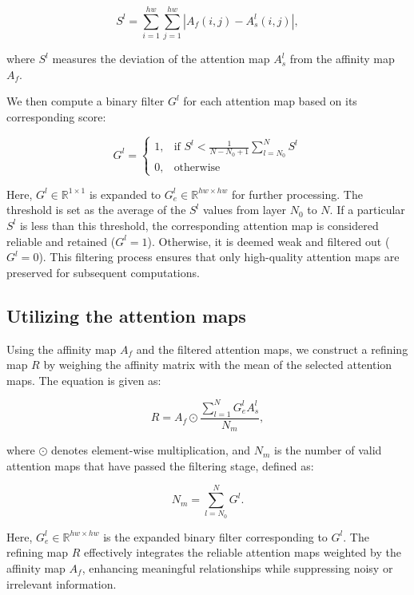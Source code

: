\begin{equation}
    S^l = \sum_{i=1}^{hw} \sum_{j=1}^{hw} \left| A_f(i, j) - A_s^l(i, j) \right|,
\end{equation}

where $S^l$ measures the deviation of the attention map $A_s^l$ from the affinity map $A_f$.

We then compute a binary filter $G^l$ for each attention map based on its corresponding score:

\begin{equation}
    G^l =
    \begin{cases}
        1, & \text{if } S^l < \frac{1}{N - N_0 + 1} \sum_{l=N_0}^N S^l \\
        0, & \text{otherwise}
    \end{cases}
\end{equation}

Here, $G^l \in \mathbb{R}^{1 \times 1}$ is expanded to $G^l_e \in \mathbb{R}^{hw \times hw}$ for further processing. The threshold is set as the average of the $S^l$ values from layer $N_0$ to $N$. If a particular $S^l$ is less than this threshold, the corresponding attention map is considered reliable and retained ($G^l = 1$). Otherwise, it is deemed weak and filtered out ($G^l = 0$). This filtering process ensures that only high-quality attention maps are preserved for subsequent computations.

\subsection{Utilizing the attention maps}
\label{subsec: mul_attn_and_aff}
Using the affinity map $A_f$ and the filtered attention maps, we construct a refining map $R$ by weighing the affinity matrix with the mean of the selected attention maps. The equation is given as:

\begin{equation}
    R = A_f \odot \frac{ \sum_{l=1}^N G^l_e A_s^l}{N_m},
\end{equation}

where $\odot$ denotes element-wise multiplication, and $N_m$ is the number of valid attention maps that have passed the filtering stage, defined as:

\begin{equation}
    N_m = \sum_{l = N_0}^N G^l.
\end{equation}

Here, $G^l_e \in \mathbb{R}^{hw \times hw}$ is the expanded binary filter corresponding to $G^l$. The refining map $R$ effectively integrates the reliable attention maps weighted by the affinity map $A_f$, enhancing meaningful relationships while suppressing noisy or irrelevant information.

